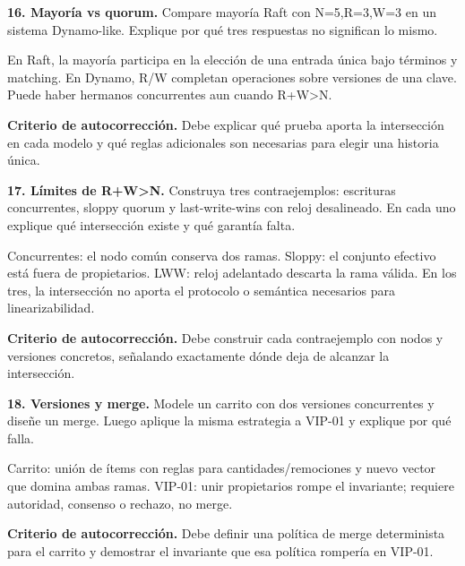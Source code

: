 \documentclass[variant=guiaresuelta,cover=institutional,mode=screen]{ua-engineering-v6-article}
\begin{document}
\begin{uaexercise}
\textbf{16. Mayoría vs quorum.} Compare mayoría Raft con N=5,R=3,W=3 en un sistema Dynamo-like. Explique por qué tres respuestas no significan lo mismo.
\end{uaexercise}
\begin{uaanswer}
En Raft, la mayoría participa en la elección de una entrada única bajo términos y matching. En Dynamo, R/W completan operaciones sobre versiones de una clave. Puede haber hermanos concurrentes aun cuando R+W>N.

\par\smallskip\textbf{Criterio de autocorrección.} Debe explicar qué prueba aporta la intersección en cada modelo y qué reglas adicionales son necesarias para elegir una historia única.
\end{uaanswer}

\begin{uaexercise}
\textbf{17. Límites de R+W>N.} Construya tres contraejemplos: escrituras concurrentes, sloppy quorum y last-write-wins con reloj desalineado. En cada uno explique qué intersección existe y qué garantía falta.
\end{uaexercise}
\begin{uaanswer}
Concurrentes: el nodo común conserva dos ramas. Sloppy: el conjunto efectivo está fuera de propietarios. LWW: reloj adelantado descarta la rama válida. En los tres, la intersección no aporta el protocolo o semántica necesarios para linearizabilidad.

\par\smallskip\textbf{Criterio de autocorrección.} Debe construir cada contraejemplo con nodos y versiones concretos, señalando exactamente dónde deja de alcanzar la intersección.
\end{uaanswer}

\begin{uaexercise}
\textbf{18. Versiones y merge.} Modele un carrito con dos versiones concurrentes y diseñe un merge. Luego aplique la misma estrategia a VIP-01 y explique por qué falla.
\end{uaexercise}
\begin{uaanswer}
Carrito: unión de ítems con reglas para cantidades/remociones y nuevo vector que domina ambas ramas. VIP-01: unir propietarios rompe el invariante; requiere autoridad, consenso o rechazo, no merge.

\par\smallskip\textbf{Criterio de autocorrección.} Debe definir una política de merge determinista para el carrito y demostrar el invariante que esa política rompería en VIP-01.
\end{uaanswer}
\end{document}
